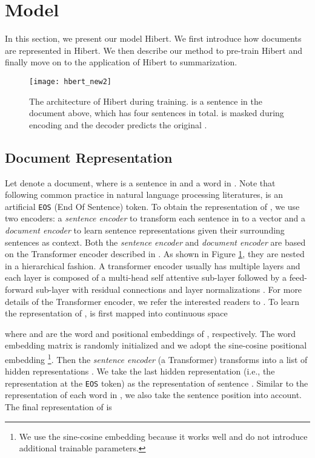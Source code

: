 \documentclass[11pt,a4paper]{article}
\begin{document}
\section{Model}
In this section, we present our model {\sc Hibert}.
We first introduce how documents are represented in {\sc Hibert}. We then describe our method to pre-train {\sc Hibert} and finally move on to the application of {\sc Hibert} to summarization.

\begin{figure}[t]
	\centering
	\texttt{[image: hbert\_new2]}
	\caption{The architecture of {\sc Hibert} during training.  is a sentence in the document above, which has four sentences in total.  is masked during encoding and the decoder predicts the original .}
	\label{fig:hbert}
\end{figure}

\subsection{Document Representation}
\label{sec:doc_repr}
Let  denote a document,  where  is a sentence in  and  a word in . Note that following common practice in natural language processing literatures,  is an artificial {\tt EOS} (End Of Sentence) token. To obtain the representation of , we use two encoders: a \emph{sentence encoder} to transform each sentence in  to a vector and a \emph{document encoder} to learn sentence representations given their surrounding sentences as context. Both the \emph{sentence encoder} and \emph{document encoder} are based on the Transformer encoder described in . As shown in Figure \ref{fig:hbert}, they are nested in a hierarchical fashion. A transformer encoder usually has multiple layers and each layer is composed of a multi-head self attentive sub-layer followed by a feed-forward sub-layer with residual connections \cite{he:2016:cvpr} and layer normalizations \cite{ba:2016:arxiv}. For more details of the Transformer encoder, we refer the interested readers to . To learn the representation of ,  is first mapped into continuous space

where  and  are the word and positional embeddings of , respectively. The word embedding matrix is randomly initialized and we adopt the sine-cosine positional embedding \cite{vaswani:2017:nips}\footnote{We use the sine-cosine embedding because it works well and do not introduce additional trainable parameters.}. Then the \emph{sentence encoder} (a Transformer) transforms  into a list of hidden representations . We take the last hidden representation  (i.e., the representation at the {\tt EOS} token) as the representation of sentence . Similar to the representation of each word in , we also take the sentence position into account. The final representation of  is 
\end{document}
